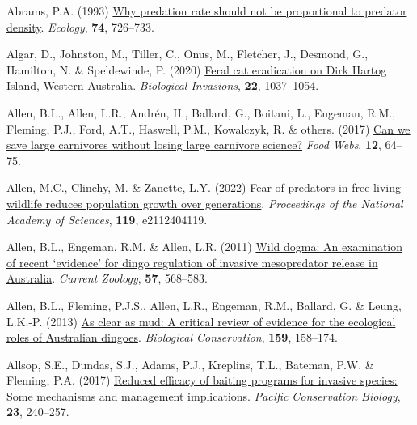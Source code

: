 \documentclass[11pt,a4paper,titlepage,twoside,openright]{style/unimelbthesis}
\newenvironment{CSLReferences}%
  {}%
  {\par}
\begin{document}
\begin{mainmatter}
\begin{CSLReferences}{1}{0}
\leavevmode{}%
Abrams, P.A. (1993) \href{https://doi.org/10.2307/1940800}{Why predation rate should not be proportional to predator density}. \emph{Ecology}, \textbf{74}, 726--733.

\leavevmode{}%
Algar, D., Johnston, M., Tiller, C., Onus, M., Fletcher, J., Desmond, G., Hamilton, N. \& Speldewinde, P. (2020) \href{https://doi.org/10.1007/s10530-019-02154-y}{Feral cat eradication on {Dirk Hartog Island, Western {A}ustralia}}. \emph{Biological Invasions}, \textbf{22}, 1037--1054.

\leavevmode{}%
Allen, B.L., Allen, L.R., Andrén, H., Ballard, G., Boitani, L., Engeman, R.M., Fleming, P.J., Ford, A.T., Haswell, P.M., Kowalczyk, R. \& others. (2017) \href{https://doi.org/10.1016/j.fooweb.2017.02.008}{Can we save large carnivores without losing large carnivore science?} \emph{Food Webs}, \textbf{12}, 64--75.

\leavevmode{}%
Allen, M.C., Clinchy, M. \& Zanette, L.Y. (2022) \href{https://doi.org/10.1073/pnas.2112404119}{Fear of predators in free-living wildlife reduces population growth over generations}. \emph{Proceedings of the National Academy of Sciences}, \textbf{119}, e2112404119.

\leavevmode{}%
Allen, B.L., Engeman, R.M. \& Allen, L.R. (2011) \href{https://doi.org/10.1093/czoolo/57.5.568}{{Wild dogma: An examination of recent {`evidence'} for dingo regulation of invasive mesopredator release in {A}ustralia}}. \emph{Current Zoology}, \textbf{57}, 568--583.

\leavevmode{}%
Allen, B.L., Fleming, P.J.S., Allen, L.R., Engeman, R.M., Ballard, G. \& Leung, L.K.-P. (2013) \href{https://doi.org/10.1016/j.biocon.2012.12.004}{As clear as mud: A critical review of evidence for the ecological roles of {A}ustralian dingoes}. \emph{Biological Conservation}, \textbf{159}, 158--174.

\leavevmode{}%
Allsop, S.E., Dundas, S.J., Adams, P.J., Kreplins, T.L., Bateman, P.W. \& Fleming, P.A. (2017) \href{https://doi.org/10.1071/PC17006}{Reduced efficacy of baiting programs for invasive species: Some mechanisms and management implications}. \emph{Pacific Conservation Biology}, \textbf{23}, 240--257.


\end{CSLReferences}
\end{mainmatter}
\end{document}
